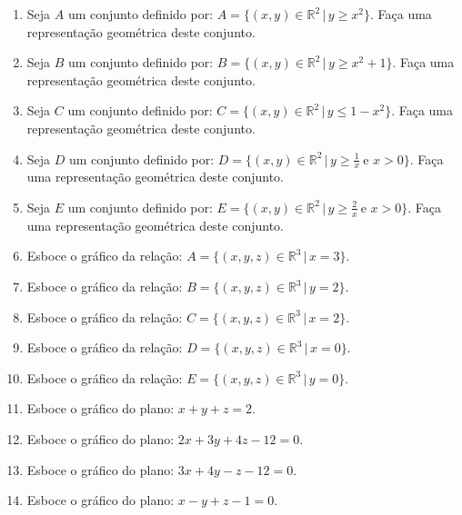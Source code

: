 \documentclass[11pt,a4paper]{article}
\begin{document}
\begin{enumerate}
\item Seja $A$ um conjunto definido por: $A = \{(x,y) \in \mathbb{R}^2 \,|\, y \geq x^2 \}$. Faça uma representação geométrica deste conjunto.

\item Seja $B$ um conjunto definido por: $B = \{(x,y) \in \mathbb{R}^2 \,|\, y \geq x^2 + 1 \}$. Faça uma representação geométrica deste conjunto.

\item Seja $C$ um conjunto definido por: $C = \{(x,y) \in \mathbb{R}^2 \,|\, y \leq 1 - x^2 \}$. Faça uma representação geométrica deste conjunto.

\item Seja $D$ um conjunto definido por: $D = \{(x,y) \in \mathbb{R}^2 \,|\, y \geq \frac{1}{x}\ \textrm{e } x > 0 \}$. Faça uma representação geométrica deste conjunto.

\item Seja $E$ um conjunto definido por: $E = \{(x,y) \in \mathbb{R}^2 \,|\, y \geq \frac{2}{x}\ \textrm{e } x > 0 \}$. Faça uma representação geométrica deste conjunto.

\item Esboce o gráfico da relação: $A = \{(x,y,z) \in \mathbb{R}^3 \,|\, x = 3 \}$.










\item Esboce o gráfico da relação: $B = \{(x,y,z) \in \mathbb{R}^3 \,|\, y = 2 \}$.
\item Esboce o gráfico da relação: $C = \{(x,y,z) \in \mathbb{R}^3 \,|\, x = 2 \}$.
\item Esboce o gráfico da relação: $D = \{(x,y,z) \in \mathbb{R}^3 \,|\, x = 0 \}$.
\item Esboce o gráfico da relação: $E = \{(x,y,z) \in \mathbb{R}^3 \,|\, y = 0 \}$.

\item Esboce o gráfico do plano: $x + y + z = 2$.
\item Esboce o gráfico do plano: $2x + 3y + 4z -12 = 0$.
\item Esboce o gráfico do plano: $3x + 4y - z - 12 = 0$.
\item Esboce o gráfico do plano: $x - y + z - 1 = 0$.






\end{enumerate}
\end{document}
